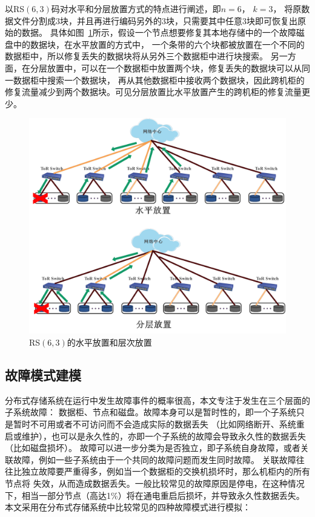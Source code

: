 以RS$(6, 3)$码对水平和分层放置方式的特点进行阐述，即$n=6$， $k=3$，
将原数据文件分割成3块，并且再进行编码另外的3块，只需要其中任意3块即可恢复出原始的数据。
具体如图~\ref{fig:5-2}所示，假设一个节点想要修复其本地存储中的一个故障磁盘中的数据块，在水平放置的方式中，
一个条带的六个块都被放置在一个不同的数据柜中，所以修复丢失的数据块将从另外三个数据柜中进行块搜索。 
另一方面，在分层放置中，可以在一个数据柜中放置两个块，修复丢失的数据块可以从同一数据柜中搜索一个数据块，
再从其他数据柜中接收两个数据块，因此跨机柜的修复流量减少到两个数据块。可见分层放置比水平放置产生的跨机柜的修复流量更少。
\begin{figure}[htbp]
	\centering
	\includegraphics [scale=0.3]{figures/5-2.pdf}
	\caption{RS$(6,3)$的水平放置和层次放置}
	\label{fig:5-2}
\end{figure}

\subsection{故障模式建模}

分布式存储系统在运行中发生故障事件的概率很高，本文专注于发生在三个层面的子系统故障：
数据柜、节点和磁盘。故障本身可以是暂时性的，即一个子系统只是暂时不可用或者不可访问而不会造成实际的数据丢失
（比如网络断开、系统重启或维护），也可以是永久性的，亦即一个子系统的故障会导致永久性的数据丢失（比如磁盘损坏）。
故障可以进一步分类为是否独立，即子系统自身故障，或者关联故障，例如一些子系统由于一个共同的故障问题而发生同时故障。
关联故障往往比独立故障要严重得多，例如当一个数据柜的交换机损坏时，那么机柜内的所有节点将
失效，从而造成数据丢失。一般比较常见的故障原因是停电，在这种情况下，相当一部分节点（高达1\%）将在通电重启后损坏，并导致永久性数据丢失。 
本文采用在分布式存储系统中比较常见的四种故障模式进行模拟：

